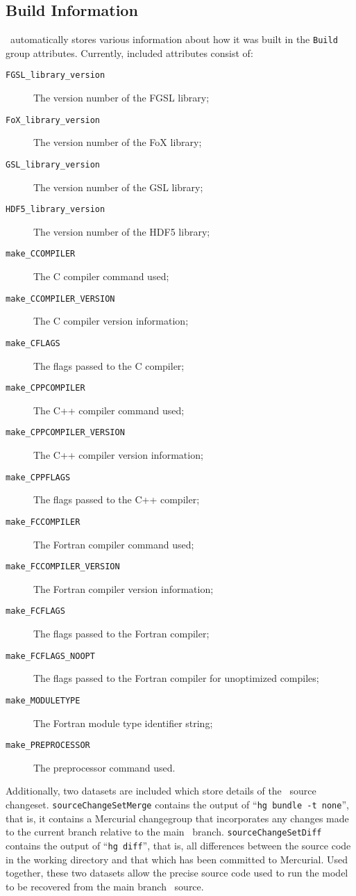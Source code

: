 \subsection{Build Information}\label{sec:BuildInformation}

\glc\ automatically stores various information about how it was built in the {\tt Build} group attributes. Currently, included attributes consist of:
\begin{description}
\item[{\tt FGSL\_library\_version}] The version number of the FGSL library;
\item[{\tt FoX\_library\_version}] The version number of the FoX library;
\item[{\tt GSL\_library\_version}] The version number of the GSL library;
\item[{\tt HDF5\_library\_version}] The version number of the HDF5 library;
\item[{\tt make\_CCOMPILER}] The C compiler command used;
\item[{\tt make\_CCOMPILER\_VERSION}] The C compiler version information;
\item[{\tt make\_CFLAGS}] The flags passed to the C compiler;
\item[{\tt make\_CPPCOMPILER}] The C++ compiler command used;
\item[{\tt make\_CPPCOMPILER\_VERSION}] The C++ compiler version information;
\item[{\tt make\_CPPFLAGS}] The flags passed to the C++ compiler;
\item[{\tt make\_FCCOMPILER}] The Fortran compiler command used;
\item[{\tt make\_FCCOMPILER\_VERSION}] The Fortran compiler version information;
\item[{\tt make\_FCFLAGS}] The flags passed to the Fortran compiler;
\item[{\tt make\_FCFLAGS\_NOOPT}] The flags passed to the Fortran compiler for unoptimized compiles;
\item[{\tt make\_MODULETYPE}] The Fortran module type identifier string;
\item[{\tt make\_PREPROCESSOR}] The preprocessor command used.
\end{description}

Additionally, two datasets are included which store details of the \glc\ source changeset. {\tt sourceChangeSetMerge} contains the output of ``{\tt hg bundle -t none}'', that is, it contains a Mercurial changegroup that incorporates any changes made to the current branch relative to the main \glc\ branch. {\tt sourceChangeSetDiff} contains the output of ``{\tt hg diff}'', that is, all differences between the source code in the working directory and that which has been committed to Mercurial. Used together, these two datasets allow the precise source code used to run the model to be recovered from the main branch \glc\ source.

